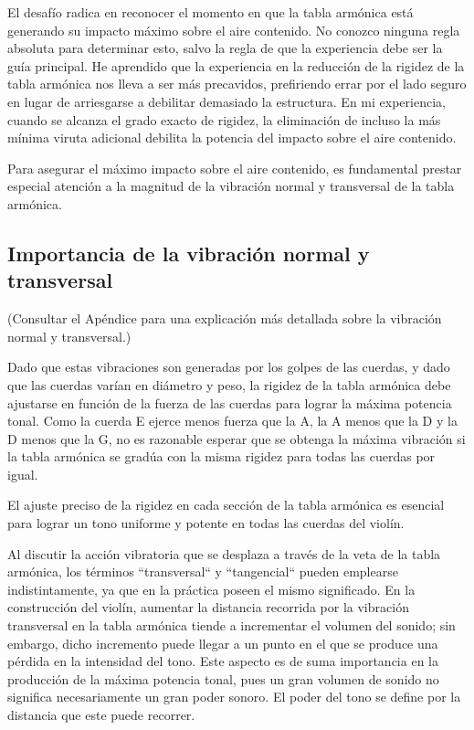 \documentclass[12pt]{book}
\begin{document}
El desafío radica en reconocer el momento en que la tabla armónica está generando su impacto máximo sobre el aire contenido. No conozco ninguna regla absoluta para determinar esto, salvo la regla de que la experiencia debe ser la guía principal. He aprendido que la experiencia en la reducción de la rigidez de la tabla armónica nos lleva a ser más precavidos, prefiriendo errar por el lado seguro en lugar de arriesgarse a debilitar demasiado la estructura. En mi experiencia, cuando se alcanza el grado exacto de rigidez, la eliminación de incluso la más mínima viruta adicional debilita la potencia del impacto sobre el aire contenido.

Para asegurar el máximo impacto sobre el aire contenido, es fundamental prestar especial atención a la magnitud de la vibración normal y transversal de la tabla armónica.

\subsection*{Importancia de la vibración normal y transversal}

(Consultar el Apéndice para una explicación más detallada sobre la vibración normal y transversal.)

Dado que estas vibraciones son generadas por los golpes de las cuerdas, y dado que las cuerdas varían en diámetro y peso, la rigidez de la tabla armónica debe ajustarse en función de la fuerza de las cuerdas para lograr la máxima potencia tonal. Como la cuerda E ejerce menos fuerza que la A, la A menos que la D y la D menos que la G, no es razonable esperar que se obtenga la máxima vibración si la tabla armónica se gradúa con la misma rigidez para todas las cuerdas por igual.

El ajuste preciso de la rigidez en cada sección de la tabla armónica es esencial para lograr un tono uniforme y potente en todas las cuerdas del violín.

Al discutir la acción vibratoria que se desplaza a través de la veta de la tabla armónica, los términos ``transversal`` y ``tangencial`` pueden emplearse indistintamente, ya que en la práctica poseen el mismo significado. En la construcción del violín, aumentar la distancia recorrida por la vibración transversal en la tabla armónica tiende a incrementar el volumen del sonido; sin embargo, dicho incremento puede llegar a un punto en el que se produce una pérdida en la intensidad del tono. Este aspecto es de suma importancia en la producción de la máxima potencia tonal, pues un gran volumen de sonido no significa necesariamente un gran poder sonoro. El poder del tono se define por la distancia que este puede recorrer.  
\end{document}
